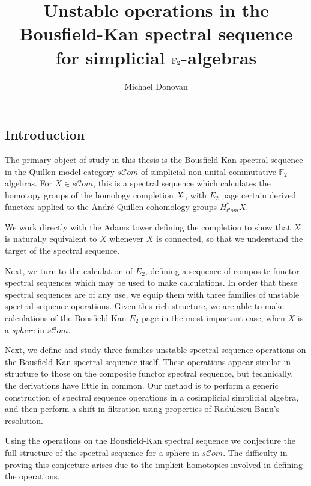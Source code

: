 \documentclass[11pt]{amsart} \renewcommand{\baselinestretch}{1.2}
\title[The Bousfield-Kan spectral sequence for simplicial algebras]{Unstable operations in the Bousfield-Kan spectral sequence for simplicial $\Ftwo$-algebras}
\author[M.\ Donovan]{Michael Donovan}
\theoremstyle{plain}
\theoremstyle{definition}
\newcommand{\scrC}{\mathscr{C}}
\newcommand{\F}{\mathbb{F}}
\newcommand{\algs}{{\scrC\!\textit{om}}}
\newcommand{\Ftwo}{\F_2}
\newcommand{\PAGEBREAK}{\vfil\pagebreak}
\begin{document}
\begin{Contents Page}
\maketitle
\ifx\PostponeContents\undefined{\tableofcontents \hfil\PAGEBREAK }\else\relax\fi
\end{Contents Page}


\begin{Introduction}
\section{\textbf{Introduction}}

The primary object of study in this thesis is the Bousfield-Kan spectral sequence in the Quillen model category $s\algs$ of simplicial non-unital commutative  $\Ftwo$-algebras. For  $X\in s\algs$, this is a spectral sequence which calculates the homotopy groups of the homology completion $X\hat{\ }$, with $E_2$ page certain derived functors applied to the Andr\'e-Quillen cohomology groups $H^*_{\algs}X$. 

We work directly with the Adams tower defining the completion to show that $X\hat{\ }$ is naturally equivalent to $X$ whenever $X$ is connected, so that we understand the target of the spectral sequence.

Next, we turn to the calculation of $E_2$, defining a sequence of composite functor spectral sequences which may be used to make calculations. In order that these spectral sequences are of any use, we equip them with three families of unstable spectral sequence operations. Given this rich structure, we are able to make calculations of the Bousfield-Kan $E_2$ page in the most important case, when $X$ is a \emph{sphere} in $s\algs$.

Next, we define and study three families unstable spectral sequence operations on the Bousfield-Kan spectral sequence itself. These operations appear similar in structure to those on the composite functor spectral sequence, but technically, the derivations have little in common. Our method is to perform a generic construction of spectral sequence operations in a cosimplicial simplicial algebra, and then perform a shift in filtration using properties of Radulescu-Banu's resolution.

Using the operations on the Bousfield-Kan spectral sequence we conjecture the full structure of the spectral sequence for a sphere in $s\algs$. The difficulty in proving this conjecture arises due to the implicit homotopies involved in defining the operations.


\end{Introduction}
\end{document}
